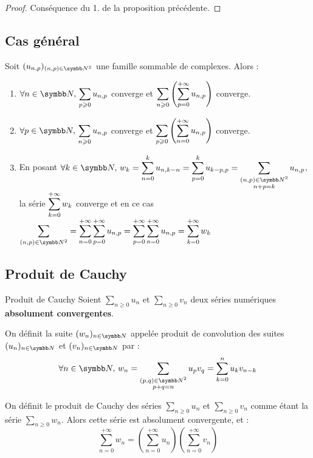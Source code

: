 \begin{proof}
    Conséquence du 1. de la proposition précédente.
\end{proof}

\subsection{Cas général}

\begin{theoreme}{}{}
    Soit $(u_{n, p})_{(n, p) \in \N^2}$ une famille sommable de complexes. Alors :

    \begin{enumerate}
        \item $\ds \forall n \in \N, \, \sum_{p \geqslant 0 } u_{n, p}$ converge et $\displaystyle \sum_{n \geqslant 0} \left( \sum_{p = 0}^{+\infty} u_{n, p} \right)$ converge.
        \item $\ds \forall p \in \N, \, \sum_{n \geqslant 0 } u_{n, p}$ converge et $\displaystyle \sum_{p \geqslant 0} \left( \sum_{n = 0}^{+\infty} u_{n, p} \right)$ converge.
        \item En posant $\ds \forall k \in \N, \, w_k = \sum_{n = 0 }^{k }u_{n, k - n} = \sum_{p = 0}^{k} u_{k - p, p} = \sum_{\substack{(n, p) \in \N^2 \\ n + p = k}} u_{n, p}$, la série $\displaystyle \sum_{k = 0}^{+\infty} w_k$ converge
            et en ce cas $\ds \sum_{(n, p) \in \N^2} = \sum_{n = 0 }^{+\infty} \sum_{p = 0}^{+\infty}u_{n, p} = \sum_{p = 0}^{+\infty} \sum_{n = 0}^{+\infty}u_{n, p} = \sum_{k = 0}^{+\infty} w_k$ 
    \end{enumerate}
\end{theoreme}

\subsection{Produit de Cauchy}

\begin{theoreme}{Produit de Cauchy}{}
    Soient $ \sum_{n \geqslant 0} u_n$ et $ \sum_{n \geqslant 0} v_n$ deux séries 
    numériques \textbf{absolument convergentes}.
    
    On définit la suite $(w_n)_{n \in \N}$ appelée produit de convolution des suites 
    $(u_n)_{n \in \N}$ et $(v_n)_{n \in \N}$ par :
    \[\forall n \in \N, \, w_n = \sum_{\substack{(p, q) \in \N^2 \\ p + q = n}} u_p v_q = \sum_{k = 0}^n u_k v_{n - k}\]

    On définit le produit de Cauchy des séries $ \sum_{n \geqslant 0} u_n$ et $ \sum_{n \geqslant 0} v_n$ 
    comme étant la série $ \sum_{n \geqslant 0} w_n$. Alors cette série est
    absolument convergente, et :
    \[\sum_{n = 0 }^{+\infty} w_n = \left( \sum_{n = 0 }^{+\infty} u_n \right) \left( \sum_{n = 0 }^{+\infty} v_n \right)\]
\end{theoreme}

